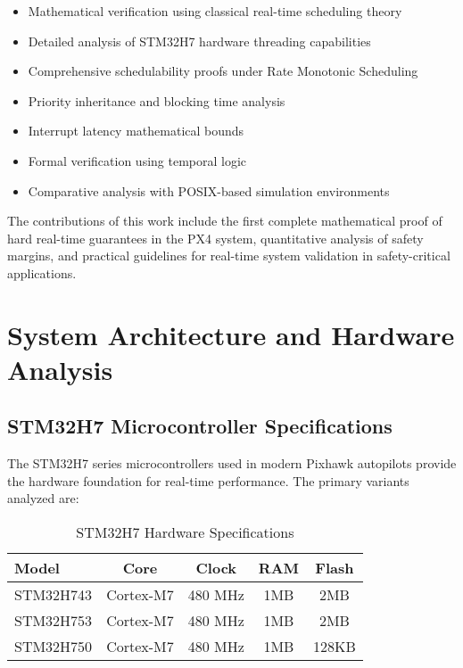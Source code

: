 \documentclass[11pt,a4paper]{article}
\theoremstyle{definition}
\theoremstyle{remark}
\begin{document}
\begin{itemize}
    \item Mathematical verification using classical real-time scheduling theory
    \item Detailed analysis of STM32H7 hardware threading capabilities
    \item Comprehensive schedulability proofs under Rate Monotonic Scheduling
    \item Priority inheritance and blocking time analysis
    \item Interrupt latency mathematical bounds
    \item Formal verification using temporal logic
    \item Comparative analysis with POSIX-based simulation environments
\end{itemize}

The contributions of this work include the first complete mathematical proof of hard real-time guarantees in the PX4 system, quantitative analysis of safety margins, and practical guidelines for real-time system validation in safety-critical applications.

\section{System Architecture and Hardware Analysis}

\subsection{STM32H7 Microcontroller Specifications}

The STM32H7 series microcontrollers used in modern Pixhawk autopilots provide the hardware foundation for real-time performance. The primary variants analyzed are:

\begin{table}[h]
\centering
\caption{STM32H7 Hardware Specifications}
\label{tab:stm32h7_specs}
\begin{tabular}{lcccc}
\toprule
\textbf{Model} & \textbf{Core} & \textbf{Clock} & \textbf{RAM} & \textbf{Flash} \\
\midrule
STM32H743 & Cortex-M7 & 480 MHz & 1MB & 2MB \\
STM32H753 & Cortex-M7 & 480 MHz & 1MB & 2MB \\
STM32H750 & Cortex-M7 & 480 MHz & 1MB & 128KB \\
\bottomrule
\end{tabular}
\end{table}
\end{document}
